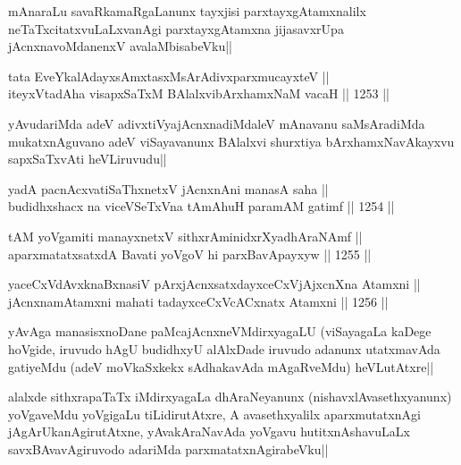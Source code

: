 \begin{artha}
mAnaraLu savaRkamaRgaLanunx tayxjisi parxtayxgAtamxnalilx neTaTxcitatxvuLaLxvanAgi parxtayxgAtamxna jijasavxrUpa jAcnxnavoMdanenxV avalaMbisabeVku||
\end{artha}

\begin{shl}
tata EveYkalAdayxsAmxtasxMsArAdivxparxmucayxteV || \\
iteyxVtadAha visapxSaTxM BAlalxvibArxhamxNaM vacaH ||  1253 ||  
\end{shl}

\begin{artha}
yAvudariMda adeV adivxtiVyajAcnxnadiMdaleV mAnavanu saMsAradiMda mukatxnAguvano adeV viSayavanunx BAlalxvi shurxtiya bArxhamxNavAkayxvu sapxSaTxvAti heVLiruvudu||
\end{artha}


\begin{shl}
yadA pacnAcxvatiSaThxnetxV jAcnxnAni manasA saha || \\
budidhxshacx na viceVSeTxVna tAmAhuH paramAM gatimf ||  1254 ||  
\end{shl}
				
\begin{shl}
tAM yoVgamiti manayxnetxV sithxrAminidxrXyadhAraNAmf || \\
aparxmatatxsatxdA Bavati yoVgoV hi parxBavApayxyw ||  1255 ||  
\end{shl}

\begin{shl}
yaceCxVdAvxknaBxnasiV pArxjAcnxsatxdayxceCxVjAjxcnXna Atamxni || \\
jAcnxnamAtamxni mahati tadayxceCxVcACxnatx Atamxni ||  1256 ||  
\end{shl}

\begin{artha}
yAvAga manasisxnoDane paMcajAcnxneVMdirxyagaLU (viSayagaLa kaDege hoVgide, iruvudo hAgU budidhxyU alAlxDade iruvudo adanunx utatxmavAda gatiyeMdu (adeV moVkaSxkekx sAdhakavAda mAgaRveMdu) heVLutAtxre||
\end{artha}

\begin{artha}
alalxde sithxrapaTaTx iMdirxyagaLa dhAraNeyanunx (nishavxlAvasethxyanunx) yoVgaveMdu yoVgigaLu tiLidirutAtxre, A avasethxyalilx aparxmutatxnAgi jAgArUkanAgirutAtxne, yAvakAraNavAda yoVgavu hutitxnAshavuLaLx savxBAvavAgiruvodo adariMda parxmatatxnAgirabeVku||
\end{artha}

